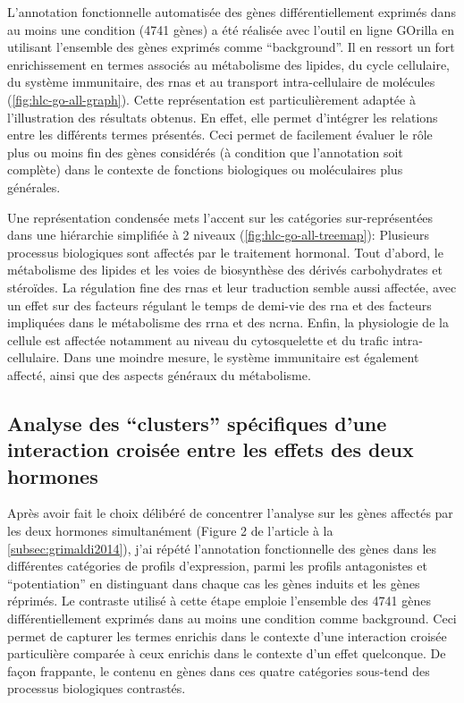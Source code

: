 \documentclass[../main.tex]{subfiles}
\begin{document}
		

		L'annotation fonctionnelle automatisée des gènes différentiellement exprimés dans au moins une condition (4741 gènes) a été réalisée avec l'outil en ligne GOrilla en utilisant l'ensemble des gènes exprimés comme ``background''.
		Il en ressort un fort enrichissement en termes associés au métabolisme des lipides, du cycle cellulaire, du système immunitaire, des \glspl{rna} et au transport intra-cellulaire de molécules (\autoref{fig:hlc-go-all-graph}).
		Cette représentation est particulièrement adaptée à l'illustration des résultats obtenus.
		En effet, elle permet d'intégrer les relations entre les différents termes présentés.
		Ceci permet de facilement évaluer le rôle plus ou moins fin des gènes considérés (à condition que l'annotation soit complète) dans le contexte de fonctions biologiques ou moléculaires plus générales.

		

		Une représentation condensée mets l'accent sur les catégories sur-représentées dans une hiérarchie simplifiée à 2 niveaux (\autoref{fig:hlc-go-all-treemap}):
		Plusieurs processus biologiques sont affectés par le traitement hormonal.
		Tout d'abord, le métabolisme des lipides et les voies de biosynthèse des dérivés carbohydrates et stéroïdes.
		La régulation fine des \glspl{rna} et leur traduction semble aussi affectée, avec un effet sur des facteurs régulant le temps de demi-vie des \gls{rna} et des facteurs impliquées dans le métabolisme des \gls{rrna} et des \gls{ncrna}.
		Enfin, la physiologie de la cellule est affectée notamment au niveau du cytosquelette et du trafic intra-cellulaire.
		Dans une moindre mesure, le système immunitaire est également affecté, ainsi que des aspects généraux du métabolisme.

		


	\subsection{Analyse des ``clusters'' spécifiques d'une interaction croisée entre les effets des deux hormones}
		Après avoir fait le choix délibéré de concentrer l'analyse sur les gènes affectés par les deux hormones simultanément (Figure 2 de l'article à la \autoref{subsec:grimaldi2014}), j'ai répété l'annotation fonctionnelle des gènes dans les différentes catégories de profils d'expression, parmi les profils antagonistes et ``potentiation'' en distinguant dans chaque cas les gènes induits et les gènes réprimés.
		Le contraste utilisé à cette étape emploie l'ensemble des 4741 gènes différentiellement exprimés dans au moins une condition comme background.
		Ceci permet de capturer les termes enrichis dans le contexte d'une interaction croisée particulière comparée à ceux enrichis dans le contexte d'un effet quelconque.
		De façon frappante, le contenu en gènes dans ces quatre catégories sous-tend des processus biologiques contrastés.
\end{document}
